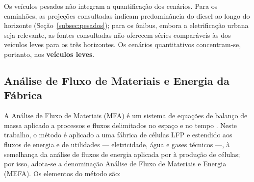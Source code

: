 Os veículos pesados não integram a quantificação dos cenários. Para os
caminhões, as projeções consultadas indicam predominância do diesel ao longo do
horizonte (Seção~\ref{subsec:pesados}); para os ônibus, embora a eletrificação
urbana seja relevante, as fontes consultadas não oferecem séries comparáveis às
dos veículos leves para os três horizontes. Os cenários quantitativos
concentram-se, portanto, nos \textbf{veículos leves}.

\subsection{Análise de Fluxo de Materiais e Energia da Fábrica}
\label{sec:met-mefa}

A Análise de Fluxo de Materiais (MFA) é um sistema de equações de balanço de
massa aplicado a processos e fluxos delimitados no espaço e no tempo
\cite{BrunnerRechberger}. Neste trabalho, o método é aplicado a uma fábrica de
células LFP e estendido aos fluxos de energia e de utilidades — eletricidade,
água e gases técnicos —, à semelhança da análise de fluxos de energia aplicada
por  à produção de células; por isso, adota-se a
denominação Análise de Fluxo de Materiais e Energia (MEFA). Os elementos do
método são:

